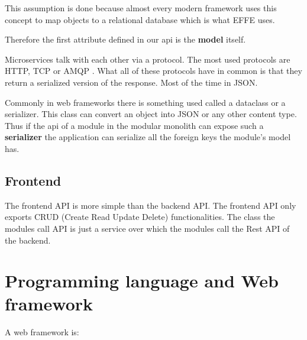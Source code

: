 This assumption is done because almost every modern framework uses this concept to map objects to a relational database which is what EFFE uses.

Therefore the first attribute defined in our api is the \textbf{model} itself.

Microservices talk with each other via a protocol. The most used protocols are HTTP, TCP or AMQP \cite{microservicesAPI}. What all of these protocols have in common is that they return a serialized version of the response. Most of the time in JSON.

Commonly in web frameworks there is something used called a dataclass or a serializer. This class can convert an object into JSON or any other content type. Thus if the api of a module in the modular monolith can expose such a \textbf{serializer} the application can serialize all the foreign keys the module's model has.



\subsection*{Frontend}

The frontend API is more simple than the backend API. The frontend API only exports CRUD (Create Read Update Delete) functionalities. The class the modules call API is just a service over which the modules call the Rest API of the backend.

\section{Programming language and Web framework}

A web framework is:


